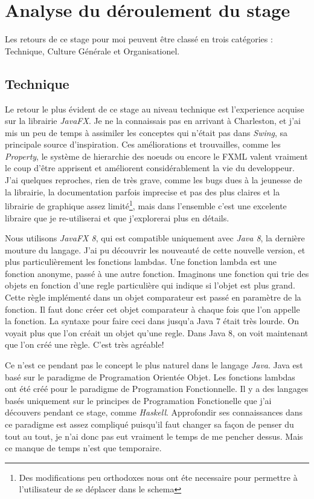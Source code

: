 \chapter{Analyse du déroulement du stage}
Les retours de ce stage pour moi peuvent être classé en trois catégories : Technique, Culture Générale et Organisationel.

\section{Technique}
Le retour le plus évident de ce stage au niveau technique est l'experience acquise sur la librairie \textit{JavaFX}. Je ne la connaissais pas en arrivant à Charleston, et j'ai mis un peu de temps à assimiler les conceptes qui n'était pas dans \textit{Swing}, sa principale source d'inspiration. Ces améliorations et trouvailles, comme les \textit{Property}, le système de hierarchie des noeuds ou encore le FXML valent vraiment le coup d'être apprisent et améliorent considérablement la vie du developpeur. J'ai quelques reproches, rien de très grave, comme les bugs dues à la jeunesse de la librairie, la documentation parfois imprecise et pas des plus claires et la librairie de graphique assez limité\footnote{Des modifications peu orthodoxes nous ont éte necessaire pour permettre à l'utilisateur de se déplacer dans le schema}, mais dans l'ensemble c'est une excelente libraire que je re-utiliserai et que j'explorerai plus en détails.

Nous utilisons \textit{JavaFX 8}, qui est compatible uniquement avec \textit{Java 8}, la dernière mouture du langage. J'ai pu découvrir les nouveauté de cette nouvelle version, et plus particulièrement les fonctions lambdas. Une fonction lambda est une fonction anonyme, passé à une autre fonction. Imaginons une fonction qui trie des objets en fonction d'une regle particulière qui indique si l'objet est plus grand. Cette règle implémenté dans un objet comparateur est passé en paramètre de la fonction. Il faut donc créer cet objet comparateur à chaque fois que l'on appelle la fonction. La syntaxe pour faire ceci dans jusqu'a Java 7 était très lourde. On voyait plus que l'on créait un objet qu'une regle. Dans Java 8, on voit maintenant que l'on créé une règle. C'est très agréable!

Ce n'est ce pendant pas le concept le plus naturel dans le langage \textit{Java}. Java est basé sur le paradigme de Programation Orientée Objet. Les fonctions lambdas ont été créé pour le paradigme de Programation Fonctionnelle. Il y a des langages basés uniquement sur le principes de Programation Fonctionelle que j'ai découvers pendant ce stage, comme \textit{Haskell}. Approfondir ses connaissances dans ce paradigme est assez compliqué puisqu'il faut changer sa façon de penser du tout au tout, je n'ai donc pas eut vraiment le temps de me pencher dessus. Mais ce manque de temps n'est que temporaire.


